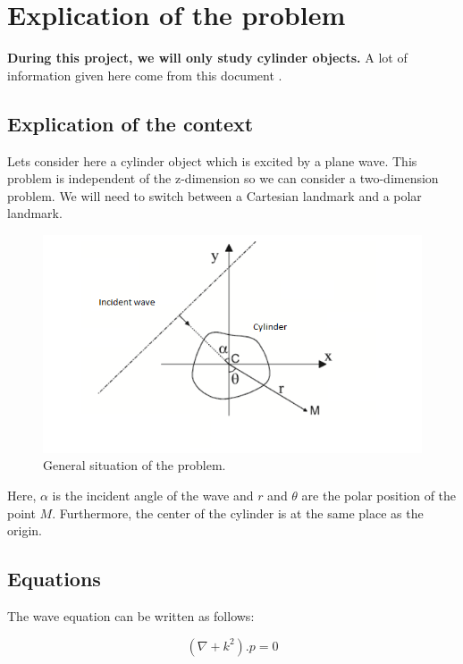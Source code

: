 \chapter{Explication of the problem}

\medskip
\textbf{During this project, we will only study cylinder objects.}
A lot of information given here come from this document \cite{EDP}.

\section{Explication of the context}

Lets consider here a cylinder object which is excited by a plane wave. This problem is independent of the z-dimension so we can consider a two-dimension problem.
We will need to switch between a Cartesian landmark and a polar landmark.
\begin{figure}[H]
\centering
    \includegraphics[scale=1,angle=0]{Images/Image2.PNG}
    \caption{General situation of the problem.}
    \label{fig:Image2}
\end{figure}

Here, $\alpha$ is the incident angle of the wave and $r$ and $\theta$ are the polar position of the point $M$. Furthermore, the center of the cylinder is at the same place as the origin. 

\section{Equations}


The wave equation can be written as follows:

\begin{equation}
 (\nabla + k^2).p = 0 
\end{equation}

